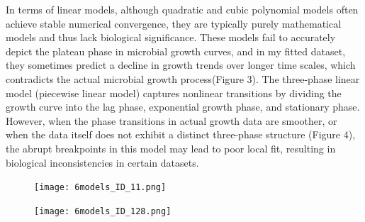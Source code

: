 \documentclass[12pt]{article}
\begin{document}
In terms of linear models, although quadratic and cubic polynomial models often achieve stable numerical convergence, they are typically purely mathematical models and thus lack biological significance. These models fail to accurately depict the plateau phase in microbial growth curves, and in my fitted dataset, they sometimes predict a decline in growth trends over longer time scales, which contradicts the actual microbial growth process(Figure 3). The three-phase linear model (piecewise linear model) captures nonlinear transitions by dividing the growth curve into the lag phase, exponential growth phase, and stationary phase. However, when the phase transitions in actual growth data are smoother, or when the data itself does not exhibit a distinct three-phase structure (Figure 4), the abrupt breakpoints in this model may lead to poor local fit, resulting in biological inconsistencies in certain datasets.

\begin{figure}[htbp]
  \centering

  \begin{minipage}[t]{0.48\textwidth}
    \centering
    \texttt{[image: 6models\_ID\_11.png]}
    \label{fig:ID11}
  \end{minipage}
  \hfill
  \begin{minipage}[t]{0.48\textwidth}
    \centering
    \texttt{[image: 6models\_ID\_128.png]}
    \label{fig:ID128}
  \end{minipage}

\end{figure}
\end{document}
